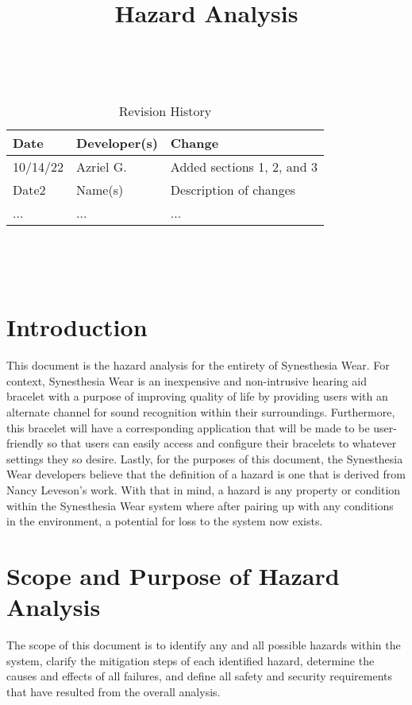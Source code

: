 \documentclass{article}
\title{Hazard Analysis\\\progname}
\author{\authname}
\date{}
\begin{document}
\maketitle
\thispagestyle{empty}

~\newpage


\begin{table}[hp]
\caption{Revision History} \label{TblRevisionHistory}
\begin{tabularx}{\textwidth}{llX}
\toprule
\textbf{Date} & \textbf{Developer(s)} & \textbf{Change}\\
\midrule
10/14/22 & Azriel G. & Added sections 1, 2, and 3\\
Date2 & Name(s) & Description of changes\\
... & ... & ...\\
\bottomrule
\end{tabularx}
\end{table}

~\newpage

\tableofcontents

~\newpage


\section{Introduction}
This document is the hazard analysis for the entirety of Synesthesia Wear.
For context, Synesthesia Wear is an inexpensive and non-intrusive hearing aid 
bracelet with a purpose of improving quality of life by providing users with 
an alternate channel for sound recognition within their surroundings. Furthermore, 
this bracelet will have a corresponding application that will be made to be 
user-friendly so that users can easily access and configure their bracelets to 
whatever settings they so desire. Lastly, for the purposes of this document, the 
Synesthesia Wear developers believe that the definition of a hazard is one that is 
derived from Nancy Leveson's work. With that in mind, a hazard is any property or 
condition within the Synesthesia Wear system where after pairing up with any 
conditions in the environment, a potential for loss to the system now exists.

\section{Scope and Purpose of Hazard Analysis}
The scope of this document is to identify any and all possible hazards within 
the system, clarify the mitigation steps of each identified hazard, determine 
the causes and effects of all failures, and define all safety and security requirements 
that have resulted from the overall analysis.
\end{document}
